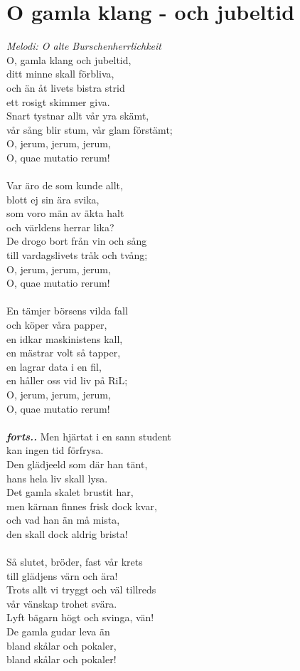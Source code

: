 \section{O gamla klang - och jubeltid}
\textit{Melodi: O alte Burschenherrlichkeit}
\vspace{2mm}\\
O, gamla klang och jubeltid,\\
ditt minne skall förbliva,\\
och än åt livets bistra strid\\
ett rosigt skimmer giva.\\
Snart tystnar allt vår yra skämt,\\
vår sång blir stum, vår glam förstämt;\\
O, jerum, jerum, jerum,\\
O, quae mutatio rerum!\\
\\
Var äro de som kunde allt,\\
blott ej sin ära svika,\\
som voro män av äkta halt\\
och världens herrar lika?\\
De drogo bort från vin och sång\\
till vardagslivets tråk och tvång;\\
O, jerum, jerum, jerum,\\
O, quae mutatio rerum!\\
\\
En tämjer börsens vilda fall\\
och köper våra papper,\\
en idkar maskinistens kall,\\
en mästrar volt så tapper,\\
en lagrar data i en fil,\\
en håller oss vid liv på RiL;\\
O, jerum, jerum, jerum,\\
O, quae mutatio rerum!\\
\\
\textbf{\textit{forts..}}
\newpage
\noindent Men hjärtat i en sann student\\
kan ingen tid förfrysa.\\
Den glädjeeld som där han tänt,\\
hans hela liv skall lysa.\\
Det gamla skalet brustit har,\\
men kärnan finnes frisk dock kvar,\\
och vad han än må mista,\\
den skall dock aldrig brista!\\
\\
Så slutet, bröder, fast vår krets\\
till glädjens värn och ära!\\
Trots allt vi tryggt och väl tillreds\\
vår vänskap trohet svära.\\
Lyft bägarn högt och svinga, vän!\\
De gamla gudar leva än\\
bland skålar och pokaler,\\
bland skålar och pokaler!

